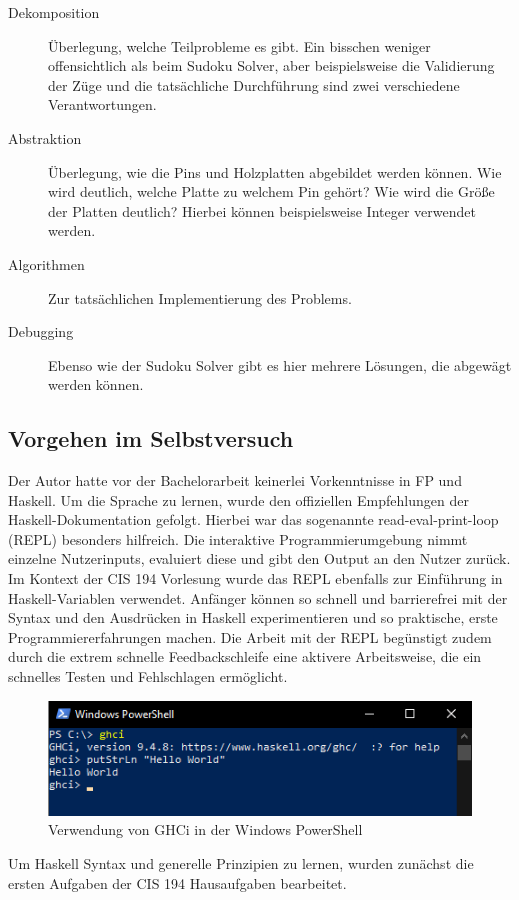 \begin{description}
    \item[Dekomposition] Überlegung, welche Teilprobleme es gibt. Ein bisschen weniger offensichtlich als beim Sudoku Solver, aber beispielsweise die Validierung der Züge und die tatsächliche Durchführung sind zwei verschiedene Verantwortungen.
    \item[Abstraktion] Überlegung, wie die Pins und Holzplatten abgebildet werden können. Wie wird deutlich, welche Platte zu welchem Pin gehört? Wie wird die Größe der Platten deutlich? Hierbei können beispielsweise Integer verwendet werden.
    \item[Algorithmen] Zur tatsächlichen Implementierung des Problems.
    \item[Debugging] Ebenso wie der Sudoku Solver gibt es hier mehrere Lösungen, die abgewägt werden können.
\end{description}

\subsection{Vorgehen im Selbstversuch}\label{sec:tools_prac}
Der Autor hatte vor der Bachelorarbeit keinerlei Vorkenntnisse in FP und Haskell. Um die Sprache zu lernen, wurde den offiziellen Empfehlungen der Haskell-Dokumentation gefolgt. Hierbei war das sogenannte read-eval-print-loop (REPL) besonders hilfreich. Die interaktive Programmierumgebung nimmt einzelne Nutzerinputs, evaluiert diese und gibt den Output an den Nutzer zurück. Im Kontext der CIS 194 Vorlesung wurde das REPL ebenfalls zur Einführung in Haskell-Variablen verwendet.
Anfänger können so schnell und barrierefrei mit der Syntax und den Ausdrücken in Haskell experimentieren und so praktische, erste Programmiererfahrungen machen.
Die Arbeit mit der REPL begünstigt zudem durch die extrem schnelle Feedbackschleife eine aktivere Arbeitsweise, die ein schnelles Testen und Fehlschlagen ermöglicht.

\begin{figure}[H]
    \centering
    \includegraphics[width=1\linewidth]{Figures/Anhang/ghci}
    \caption{Verwendung von GHCi in der Windows PowerShell}
\end{figure}

Um Haskell Syntax und generelle Prinzipien zu lernen, wurden zunächst die ersten Aufgaben der CIS 194 Hausaufgaben bearbeitet.